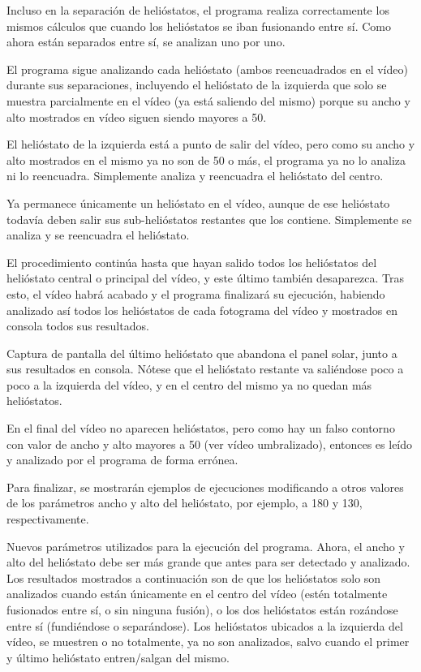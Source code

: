 \documentclass[12pt]{article}
\begin{document}
Incluso en la separación de helióstatos, el programa realiza correctamente los mismos cálculos que cuando los helióstatos se iban fusionando entre sí. Como ahora están separados entre sí, se analizan uno por uno.




El programa sigue analizando cada helióstato (ambos reencuadrados en el vídeo) durante sus separaciones, incluyendo el helióstato de la izquierda que solo se muestra parcialmente en el vídeo (ya está saliendo del mismo) porque su ancho y alto mostrados en vídeo siguen siendo mayores a 50.




El helióstato de la izquierda está a punto de salir del vídeo, pero como su ancho y alto mostrados en el mismo ya no son de 50 o más, el programa ya no lo analiza ni lo reencuadra. Simplemente analiza y reencuadra el helióstato del centro.




Ya permanece únicamente un helióstato en el vídeo, aunque de ese helióstato todavía deben salir sus sub-helióstatos restantes que los contiene. Simplemente se analiza y se reencuadra el helióstato.

El procedimiento continúa hasta que hayan salido todos los helióstatos del helióstato central o principal del vídeo, y este último también desaparezca. Tras esto, el vídeo habrá acabado y el programa finalizará su ejecución, habiendo analizado así todos los helióstatos de cada fotograma del vídeo y mostrados en consola todos sus resultados.



Captura de pantalla del último helióstato que abandona el panel solar, junto a sus resultados en consola. Nótese que el helióstato restante va saliéndose poco a poco a la izquierda del vídeo, y en el centro del mismo ya no quedan más helióstatos.





En el final del vídeo no aparecen helióstatos, pero como hay un falso contorno con valor de ancho y alto mayores a 50 (ver vídeo umbralizado), entonces es leído y analizado por el programa de forma errónea.

Para finalizar, se mostrarán ejemplos de ejecuciones modificando a otros valores de los parámetros ancho y alto del helióstato, por ejemplo, a 180 y 130, respectivamente.




Nuevos parámetros utilizados para la ejecución del programa. Ahora, el ancho y alto del helióstato debe ser más grande que antes para ser detectado y analizado. Los resultados mostrados a continuación son de que los helióstatos solo son analizados cuando están únicamente en el centro del vídeo (estén totalmente fusionados entre sí, o sin ninguna fusión), o los dos helióstatos están rozándose entre sí (fundiéndose o separándose). Los helióstatos ubicados a la izquierda del vídeo, se muestren o no totalmente, ya no son analizados, salvo cuando el primer y último helióstato entren/salgan del mismo.
\end{document}
